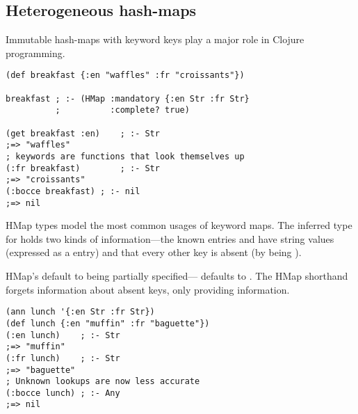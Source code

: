 %
%
%

\subsection{Heterogeneous hash-maps}

Immutable hash-maps with keyword keys play a major role in Clojure programming.

\begin{verbatim}
(def breakfast {:en "waffles" :fr "croissants"})

breakfast ; :- (HMap :mandatory {:en Str :fr Str}
          ;          :complete? true)

(get breakfast :en)    ; :- Str
;=> "waffles"
; keywords are functions that look themselves up
(:fr breakfast)        ; :- Str
;=> "croissants"
(:bocce breakfast) ; :- nil
;=> nil
\end{verbatim}

HMap types model the most common usages of keyword maps.
The inferred type for  holds two kinds of information---the known entries 
and  have string values (expressed as a  entry) and that 
every other key is absent (by  being ).

HMap's default to being partially specified--- defaults to . The HMap shorthand 
forgets 
information about absent keys, only providing 
information.

\begin{verbatim}
(ann lunch '{:en Str :fr Str})
(def lunch {:en "muffin" :fr "baguette"})
(:en lunch)    ; :- Str
;=> "muffin"
(:fr lunch)    ; :- Str
;=> "baguette"
; Unknown lookups are now less accurate
(:bocce lunch) ; :- Any
;=> nil
\end{verbatim}


